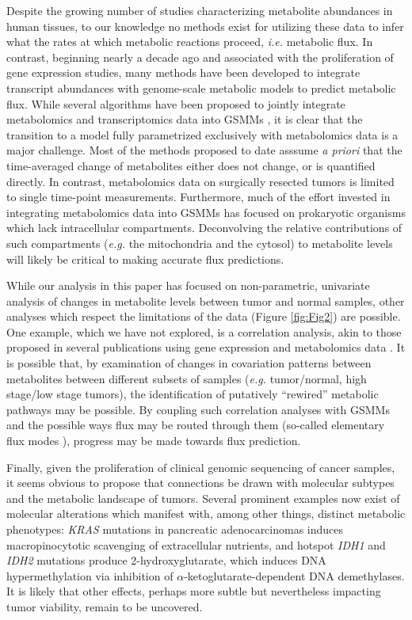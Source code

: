 \documentclass[10pt]{article}
\begin{document}
Despite the growing number of studies characterizing metabolite abundances in human tissues, to our knowledge no methods exist for utilizing these data to infer what the rates at which metabolic reactions proceed, \textit{i.e.} metabolic flux. In contrast, beginning nearly a decade ago and associated with the proliferation of gene expression studies, many methods have been developed to integrate transcript abundances with genome-scale metabolic models to predict metabolic flux. While several algorithms have been proposed to jointly integrate metabolomics and transcriptomics data into GSMMs \cite{Reznik2013,ShlomiPaper}, it is clear that the transition to a model fully parametrized exclusively with metabolomics data is a major challenge. Most of the methods proposed to date asssume \textit{a priori} that the time-averaged change of metabolites either does not change, or is quantified directly. In contrast, metabolomics data on surgically resected tumors is limited to single time-point measurements. Furthermore, much of the effort invested in integrating metabolomics data into GSMMs has focused on prokaryotic organisms which lack intracellular compartments. Deconvolving the relative contributions of such compartments (\textit{e.g.} the mitochondria and the cytosol) to metabolite levels will likely be critical to making accurate flux predictions.

While our analysis in this paper has focused on non-parametric, univariate analysis of changes in metabolite levels between tumor and normal samples, other analyses which respect the limitations of the data (Figure \ref{fig:Fig2}) are possible. One example, which we have not explored, is a correlation analysis, akin to those proposed in several publications using gene expression and metabolomics data \cite{Reznik2015,etc}. It is possible that, by examination of changes in covariation patterns between metabolites between different subsets of samples (\textit{e.g.} tumor/normal, high stage/low stage tumors), the identification of putatively ``rewired'' metabolic pathways may be possible. By coupling such correlation analyses with GSMMs and the possible ways flux may be routed through them (so-called elementary flux modes \cite{EFMs}), progress may be made towards flux prediction.

Finally, given the proliferation of clinical genomic sequencing of cancer samples, it seems obvious to propose that connections be drawn with molecular subtypes and the metabolic landscape of tumors. Several prominent examples now exist of molecular alterations which manifest with, among other things, distinct metabolic phenotypes: \textit{KRAS} mutations in pancreatic adenocarcinomas induces macropinocytotic scavenging of extracellular nutrients, and hotspot \textit{IDH1} and \textit{IDH2} mutations produce 2-hydroxyglutarate, which induces DNA hypermethylation via inhibition of $\alpha$-ketoglutarate-dependent DNA demethylases. It is likely that other effects, perhaps more subtle but nevertheless impacting tumor viability, remain to be uncovered.
\end{document}
